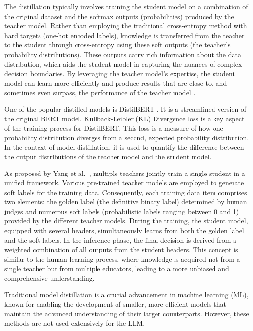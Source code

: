 The distillation typically involves training the student model on a combination of the original dataset and the softmax outputs (probabilities) produced by the teacher model. Rather than employing the traditional cross-entropy method with hard targets (one-hot encoded labels), knowledge is transferred from the teacher to the student through cross-entropy using these soft outputs (the teacher’s probability distributions). These outputs carry rich information about the data distribution, which aids the student model in capturing the nuances of complex decision boundaries. By leveraging the teacher model’s expertise, the student model can learn more efficiently and produce results that are close to, and sometimes even surpass, the performance of the teacher model \cite{distilling}.

One of the popular distilled models is DistilBERT \cite{distilbert}. It is a streamlined version of the original BERT model. Kullback-Leibler (KL) Divergence loss \cite{kl} is a key aspect of the training process for DistilBERT\@. This loss is a measure of how one probability distribution diverges from a second, expected probability distribution. In the context of model distillation, it is used to quantify the difference between the output distributions of the teacher model and the student model.

As proposed by Yang et al.\ \cite{multidistil}, multiple teachers jointly train a single student in a unified framework. Various pre-trained teacher models are employed to generate soft labels for the training data. Consequently, each training data item comprises two elements: the golden label (the definitive binary label) determined by human judges and numerous soft labels (probabilistic labels ranging between 0 and 1) provided by the different teacher models. During the training, the student model, equipped with several headers, simultaneously learns from both the golden label and the soft labels. In the inference phase, the final decision is derived from a weighted combination of all outputs from the student headers. This concept is similar to the human learning process, where knowledge is acquired not from a single teacher but from multiple educators, leading to a more unbiased and comprehensive understanding.

Traditional model distillation is a crucial advancement in machine learning (ML), known for enabling the development of smaller, more efficient models that maintain the advanced understanding of their larger counterparts. However, these methods are not used extensively for the LLM.

